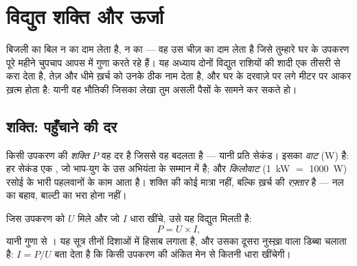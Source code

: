 \chapter{विद्युत शक्ति और ऊर्जा}\label{ch:g9:electric-power-energy}

बिजली का बिल न  का दाम लेता है, न  का --- वह उस चीज़ का
दाम लेता है जिसे तुम्हारे घर के उपकरण पूरे महीने चुपचाप आपस में गुणा
करते रहे हैं। यह अध्याय दोनों विद्युत राशियों की शादी एक तीसरी से करा
देता है, तेज़ और धीमे ख़र्च को उनके ठीक नाम देता है, और घर के दरवाज़े
पर लगे मीटर पर आकर ख़त्म होता है: यानी वह भौतिकी जिसका लेखा तुम असली
पैसों के सामने कर सकते हो।

\section{शक्ति: पहुँचाने की दर}

\begin{definition}[शक्ति और वाट]\label{def:g9:electric-power-energy:power}
किसी उपकरण की \emph{शक्ति} $P$ वह दर है जिससे वह 
बदलता है --- यानी  प्रति सेकंड। इसका  \emph{वाट}
(\unit{W}) है: हर सेकंड एक , जो भाप-युग के उस अभियंता के सम्मान में
है; और \emph{किलोवाट} (\qty{1}{kW} $=$ \qty{1000}{W}) रसोई के भारी
पहलवानों के काम आता है। शक्ति  की कोई मात्रा नहीं, बल्कि ख़र्च की
\emph{रफ़्तार} है --- नल का बहाव, बाल्टी का भरा होना नहीं।
\end{definition}

\begin{proposition}[विद्युत शक्ति]\label{prop:g9:electric-power-energy:UI}
जिस उपकरण को $U$  मिले और जो $I$ धारा खींचे, उसे यह विद्युत
 मिलती है:
\[
P = U \times I ,
\]
यानी  गुणा  से । यह सूत्र तीनों दिशाओं में हिसाब लगाता
है, और उसका दूसरा नुस्ख़ा  वाला डिब्बा चलाता है: $I = P/U$ बता
देता है कि किसी उपकरण की अंकित  मेन से कितनी धारा खींचेगी।
\end{proposition}

